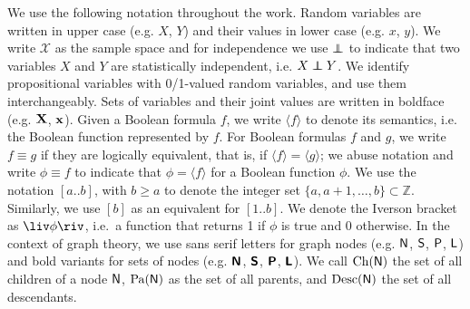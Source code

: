 We use the following notation throughout the work. Random variables are written in upper case (e.g.
$X$, $Y$) and their values in lower case (e.g. $x$, $y$). We write $\mathcal{X}$ as the sample
space and for independence we use $\indep$ to indicate that two variables $X$ and $Y$ are
statistically independent, i.e. $X\indep Y$. We identify propositional variables with 0/1-valued
random variables, and use them interchangeably.  Sets of variables and their joint values are
written in boldface (e.g. $\mathbf{X}$, $\mathbf{x}$). Given a Boolean formula $f$, we write $\langle
f\rangle$ to denote its semantics, i.e. the Boolean function represented by $f$. For Boolean
formulas $f$ and $g$, we write $f\equiv g$ if they are logically equivalent, that is, if $\langle
f\rangle = \langle g\rangle$; we abuse notation and write $\phi\equiv f$ to indicate that $\phi=
\langle f\rangle$ for a Boolean function $\phi$. We use the notation $[a..b]$, with $b\geq
a$ to denote the integer set $\{a,a+1,\ldots,b\}\subset\mathbb{Z}$. Similarly, we use $[b]$ as an
equivalent for $[1..b]$. We denote the Iverson bracket as $\liv\phi\riv$, i.e.\ a function that
returns 1 if $\phi$ is true and 0 otherwise. In the context of graph theory, we use sans serif
letters for graph nodes (e.g. $\operatorname{\textsf{N}}$, $\operatorname{\textsf{S}}$, $\operatorname{\textsf{P}}$, $\operatorname{\textsf{L}}$) and bold variants for sets of
nodes (e.g. $\operatorname{\textsf{\textbf{N}}}$, $\operatorname{\textsf{\textbf{S}}}$, $\operatorname{\textsf{\textbf{P}}}$, $\operatorname{\textsf{\textbf{L}}}$). We call $\operatorname*{\normalfont{Ch}}(\operatorname{\textsf{N}})$ the set of all children
of a node $\operatorname{\textsf{N}}$, $\operatorname*{\normalfont{Pa}}(\operatorname{\textsf{N}})$ as the set of all parents, and $\operatorname*{\normalfont{Desc}}(\operatorname{\textsf{N}})$ the set of all
descendants.

\tableofcontents

\egroup %


